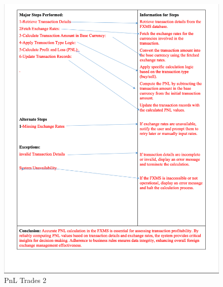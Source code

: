 \documentclass[a4paper]{report}
\begin{document}
\begin{figure}[h!]
    \centering
    \includegraphics[width=\textwidth]{images/uc/10.2-pnl-trades.png}
    \caption{PnL Trades 2}
    \label{fig:10.2-pnl-trades}
\end{figure}
\end{document}
